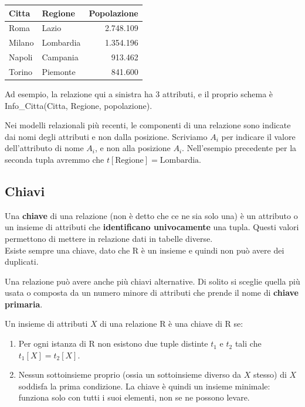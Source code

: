 \documentclass[11pt, a4paper, titlepage, oneside]{scrbook}
\begin{document}
\begin{minipage}[c]{0.55\textwidth}
\centering
\begin{tabular}{|l|l|r|}
\hline
\textbf{Citta} & \textbf{Regione} & \textbf{Popolazione} \\
\hline
Roma & Lazio & 2.748.109 \\
\hline
Milano & Lombardia & 1.354.196 \\
\hline
Napoli & Campania & 913.462 \\
\hline
Torino & Piemonte & 841.600 \\
\hline
\end{tabular}
\end{minipage}\hfill
\begin{minipage}[c]{0.40\textwidth}
Ad esempio, la relazione qui a sinistra ha 3 attributi, e il proprio schema è Info\_Citta(Citta, Regione, popolazione).
\end{minipage}

Nei modelli relazionali più recenti, le componenti di una relazione sono indicate dai nomi degli attributi e non dalla posizione. Scriviamo \code{t[}$A_i$\code{]} per indicare il valore dell'attributo di nome $A_i$, e non alla posizione $A_i$. Nell'esempio precedente per la seconda tupla avremmo che $t[\text{Regione}] = \text{Lombardia}$.

\subsection{Chiavi}

\begin{Definizione}[Chiave]
\label{def-chiave}
Una \textbf{chiave} di una relazione (non è detto che ce ne sia solo una) è un attributo o un insieme di attributi che \textbf{identificano univocamente} una tupla. Questi valori permettono di mettere in relazione dati in tabelle diverse. \\
\NB Esiste sempre una chiave, dato che R è un insieme e quindi non può avere dei duplicati.
\end{Definizione}

Una relazione può avere anche più chiavi alternative. Di solito si sceglie quella più usata o composta da un numero minore di attributi che prende il nome di \textbf{chiave primaria}.

Un insieme di attributi $X$ di una relazione R è una chiave di R se:
\begin{enumerate}
    \item Per ogni istanza di R non esistono due tuple distinte $t_1$ e $t_2$ tali che $t_1[X] = t_2[X]$.
    \item Nessun sottoinsieme proprio (ossia un sottoinsieme diverso da $X$ stesso) di $X$ soddisfa la prima condizione. La chiave è quindi un insieme minimale: funziona solo con tutti i suoi elementi, non se ne possono levare.
\end{enumerate}
\end{document}
